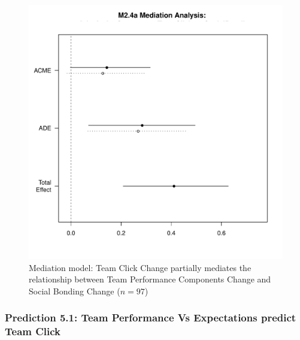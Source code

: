 \begin{CJK}{UTF8}{gbsn}
  \begin{figure}[htbp]
    \centering
    \includegraphics[scale=.5]{images/MLM24aMediationAnalysisOffline1.pdf}
    \caption{Mediation model: Team Click Change partially mediates the relationship between Team Performance Components Change and Social Bonding Change ($n = 97$)}
    \label{fig:MLM24aMediationAnalysis}
  \end{figure}





















\subsubsection{Prediction 5.1: Team Performance Vs Expectations predict Team Click\label{sect:prediction1b}}


\end{CJK}
